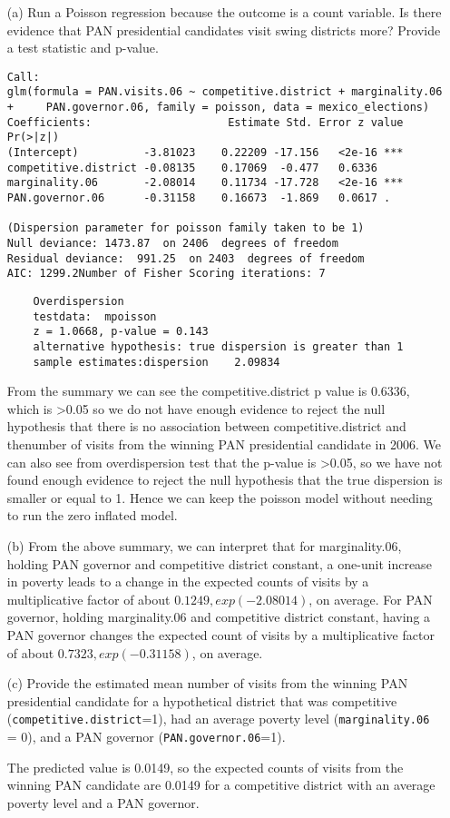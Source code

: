 \documentclass[12pt,letterpaper]{article}
\begin{document}
\begin{enumerate}
	\item [(a)]
	Run a Poisson regression because the outcome is a count variable. Is there evidence that PAN presidential candidates visit swing districts more? Provide a test statistic and p-value.
	 
		\begin{lstlisting}		
Call:
glm(formula = PAN.visits.06 ~ competitive.district + marginality.06 +     PAN.governor.06, family = poisson, data = mexico_elections)
Coefficients:                     Estimate Std. Error z value Pr(>|z|)    
(Intercept)          -3.81023    0.22209 -17.156   <2e-16 ***
competitive.district -0.08135    0.17069  -0.477   0.6336    
marginality.06       -2.08014    0.11734 -17.728   <2e-16 ***
PAN.governor.06      -0.31158    0.16673  -1.869   0.0617 .  

(Dispersion parameter for poisson family taken to be 1)    
Null deviance: 1473.87  on 2406  degrees of freedom
Residual deviance:  991.25  on 2403  degrees of freedom
AIC: 1299.2Number of Fisher Scoring iterations: 7
	\end{lstlisting}	
		\begin{lstlisting}		
	Overdispersion 
	testdata:  mpoisson
	z = 1.0668, p-value = 0.143
	alternative hypothesis: true dispersion is greater than 1
	sample estimates:dispersion    2.09834 
	\end{lstlisting}	
From the  summary we can see the  competitive.district p value is 0.6336, which is >0.05 so we do not have enough evidence to reject the null hypothesis that there is no association between competitive.district and thenumber of visits from the winning PAN presidential candidate in 2006. We can also see from overdispersion test that the p-value is >0.05, so we have not found enough evidence to reject the null hypothesis that the true dispersion is smaller or equal to 1. Hence we can keep the poisson model without needing to run the zero inflated model.
	\item [(b)]
From the above summary, we can interpret that for marginality.06, holding PAN governor and competitive district constant, a one-unit increase in poverty leads to a change in the expected counts of visits by a multiplicative factor of about \(0.1249 ,exp(-2.08014)\), on average. For PAN governor, holding marginality.06 and competitive district constant, having a PAN governor changes the expected count of visits by a multiplicative factor of about \(0.7323 ,exp(-0.31158)\), on average.

	\item [(c)]
	Provide the estimated mean number of visits from the winning PAN presidential candidate for a hypothetical district that was competitive (\texttt{competitive.district}=1), had an average poverty level (\texttt{marginality.06} = 0), and a PAN governor (\texttt{PAN.governor.06}=1).
	 
The predicted value is 0.0149, so the expected counts of visits from the winning PAN candidate are 0.0149 for a competitive district with an average poverty level and a PAN governor.

\end{enumerate}
\end{document}
